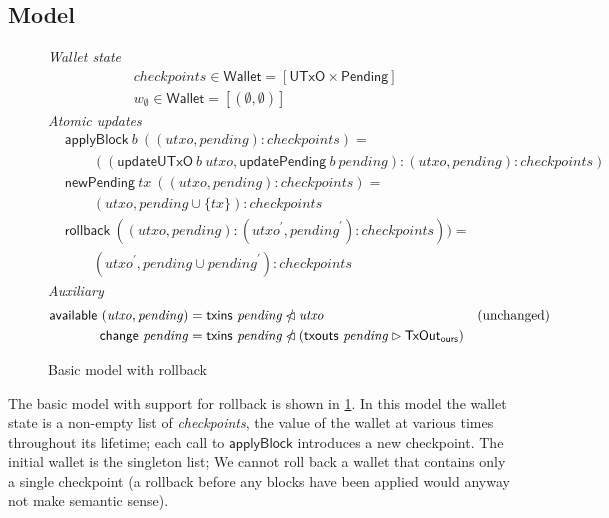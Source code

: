 \documentclass{article}
\newcommand{\restrictdom}{\lhd}
\newcommand{\subtractdom}{\mathbin{\slashed{\restrictdom}}}
\newcommand{\restrictrange}{\rhd}
\theoremstyle{definition}{
  \newtheorem{lemma}{Lemma}[section] %
  \newtheorem{definition}[lemma]{Definition}
}
\theoremstyle{theorem}{
  \newtheorem{invariant}[lemma]{Invariant}
  \newtheorem{proofobligation}[lemma]{Proof Obligation}
}
\numberwithin{equation}{lemma}
\begin{document}
\subsection{Model}

\begin{figure}
%
\emph{Wallet state}
%
\begin{align*}
& \mathit{checkpoints} \in \mathsf{Wallet} = [\mathsf{UTxO} \times \mathsf{Pending}] \\
& w_\emptyset \in \mathsf{Wallet} = [(\emptyset, \emptyset)]
\end{align*}
%
\emph{Atomic updates}
%
\begin{align*}
& \mathsf{applyBlock} ~ b ~ ((\mathit{utxo}, \mathit{pending}) : \mathit{checkpoints}) = \\
& \qquad (( \mathsf{updateUTxO} ~ b ~ \mathit{utxo}
         , \mathsf{updatePending} ~ b ~ \mathit{pending}
         )
         : (\mathit{utxo}, \mathit{pending}) : \mathit{checkpoints}
         ) \\
& \mathsf{newPending} ~ \mathit{tx} ~ ((\mathit{utxo}, \mathit{pending}) : \mathit{checkpoints}) = \\
& \qquad (\mathit{utxo}, \mathit{pending} \cup \{ \mathit{tx} \} ) : \mathit{checkpoints} \\
& \mathsf{rollback} ~ ((\mathit{utxo}, \mathit{pending}) :  (\mathit{utxo}^\prime, \mathit{pending}^\prime) : \mathit{checkpoints})) = \\
& \qquad (\mathit{utxo}^\prime, \mathit{pending} \cup \mathit{pending}^\prime) : \mathit{checkpoints}
\end{align*}
%
\emph{Auxiliary}
%
\begin{align*}
\mathsf{available} ~ (\mathit{utxo}, \mathit{pending})
   & = \mathsf{txins} ~ \mathit{pending} \subtractdom \mathit{utxo} & \text{(unchanged)} \\
\mathsf{change} ~ \mathit{pending}
   & = \mathsf{txins} ~ \mathit{pending} \subtractdom (\mathsf{txouts} ~ \mathit{pending} \restrictrange \mathsf{TxOut_{ours}})
\end{align*}
%
\caption{\label{fig:basic_rollback_model}Basic model with rollback}
\end{figure}

The basic model with support for rollback is shown in
\cref{fig:basic_rollback_model}. In this model the wallet state is a non-empty list
of \emph{checkpoints}, the value of the wallet at various times throughout its
lifetime; each call to $\mathsf{applyBlock}$ introduces a new checkpoint. The
initial wallet is the singleton list; We cannot roll back a wallet that contains
only a single checkpoint (a rollback before any blocks have been applied would
anyway not make semantic sense).
\end{document}
